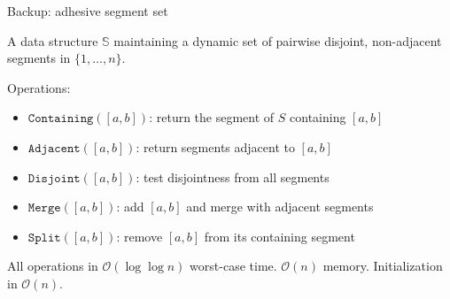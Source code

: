 \documentclass[aspectratio=169,11pt]{beamer}
\newcommand{\Oh}{\mathcal{O}}
\begin{document}
\begin{frame}{Backup: adhesive segment set}

{\small A data structure $\mathbb{S}$ maintaining a dynamic set of pairwise disjoint, non-adjacent segments in $\{1,\ldots,n\}$.}

\medskip
Operations:
\begin{itemize}
\item $\mathtt{Containing}([a,b])$: return the segment of $S$ containing $[a,b]$
\item $\mathtt{Adjacent}([a,b])$: return segments adjacent to $[a,b]$
\item $\mathtt{Disjoint}([a,b])$: test disjointness from all segments
\item $\mathtt{Merge}([a,b])$: add $[a,b]$ and merge with adjacent segments
\item $\mathtt{Split}([a,b])$: remove $[a,b]$ from its containing segment
\end{itemize}

\medskip
{\small All operations in $\Oh(\log\log n)$ worst-case time. \quad $\Oh(n)$ memory. \quad Initialization in $\Oh(n)$.}

\bigskip
\centering
{}
\end{frame}
\end{document}
